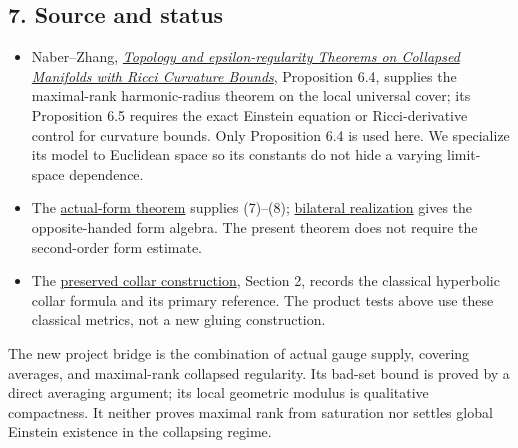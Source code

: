 \documentclass[
  11pt,
]{article}
\providecommand{\tightlist}{%
  \setlength{\itemsep}{0pt}\setlength{\parskip}{0pt}}
\begin{document}
\hypertarget{source-and-status}{%
\subsection{7. Source and status}\label{source-and-status}}

\begin{itemize}
\tightlist
\item
  Naber--Zhang, \href{https://arxiv.org/html/1412.1326}{\emph{Topology
  and epsilon-regularity Theorems on Collapsed Manifolds with Ricci
  Curvature Bounds}}, Proposition 6.4, supplies the maximal-rank
  harmonic-radius theorem on the local universal cover; its Proposition
  6.5 requires the exact Einstein equation or Ricci-derivative control
  for curvature bounds. Only Proposition 6.4 is used here. We specialize
  its model to Euclidean space so its constants do not hide a varying
  limit-space dependence.
\item
  The
  \href{../mathematics/current/line1_composed_application.md}{actual-form
  theorem} supplies (7)--(8);
  \href{20260924_bilateral_realization.md}{bilateral realization} gives
  the opposite-handed form algebra. The present theorem does not require
  the second-order form estimate.
\item
  The \href{../mathematics/current/round11_closed_gluing.md}{preserved
  collar construction}, Section 2, records the classical hyperbolic
  collar formula and its primary reference. The product tests above use
  these classical metrics, not a new gluing construction.
\end{itemize}

The new project bridge is the combination of actual gauge supply,
covering averages, and maximal-rank collapsed regularity. Its bad-set
bound is proved by a direct averaging argument; its local geometric
modulus is qualitative compactness. It neither proves maximal rank from
saturation nor settles global Einstein existence in the collapsing
regime.
\end{document}

